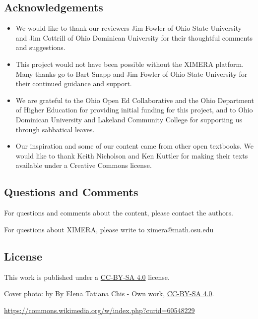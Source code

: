\documentclass{ximera}
\begin{document}

\subsection{Acknowledgements}
\begin{itemize}
\item
We would like to thank our reviewers Jim Fowler of Ohio State University and Jim Cottrill of Ohio Dominican University for their thoughtful comments and suggestions.  
\item This project would not have been possible without the XIMERA platform.  Many thanks go to Bart Snapp and Jim Fowler of Ohio State University for their continued guidance and support.   
\item We are grateful to the Ohio Open Ed Collaborative and the Ohio Department of Higher Education for providing initial funding for this project, and to Ohio Dominican University and Lakeland Community College for supporting us through sabbatical leaves.
\item Our inspiration and some of our content came from other open textbooks. We would like to thank Keith Nicholson and Ken Kuttler for making their texts available under a Creative Commons license.
\end{itemize}

\subsection{Questions and Comments}
For questions and comments about the content, please contact the authors.

For questions about XIMERA, please write to ximera@math.osu.edu

\subsection{License}
This work is published under a \href{https://creativecommons.org/licenses/by-sa/4.0/deed.en}{CC-BY-SA 4.0} license.

Cover photo:   by By Elena Tatiana Chis - Own work, \href{https://creativecommons.org/licenses/by-sa/4.0/deed.en}{CC-BY-SA 4.0}.  

\href{https://commons.wikimedia.org/w/index.php?curid=60548229}{https://commons.wikimedia.org/w/index.php?curid=60548229}
\end{document}
